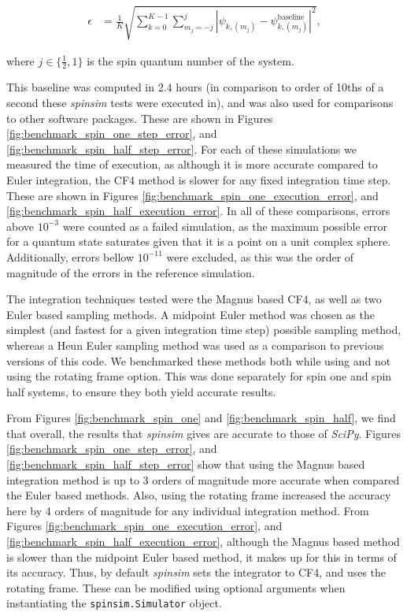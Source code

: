 \documentclass{jors}
\begin{document}
		\begin{align}
			\epsilon &= \frac{1}{K}\sqrt{\sum_{k = 0}^{K - 1}\sum_{m_j = -j}^j|\psi_{k, (m_j)} - \psi_{k, (m_j)}^{\textrm{baseline}}|^2},\label{eq:error}
		\end{align}

		where \(j \in \{\frac12, 1\}\) is the spin quantum number of the system.

		This baseline was computed in 2.4 hours (in comparison to order of 10ths of a second these \emph{spinsim} tests were executed in), and was also used for comparisons to other software packages.
		These are shown in Figures \ref{fig:benchmark_spin_one_step_error}, and \ref{fig:benchmark_spin_half_step_error}.
		For each of these simulations we measured the time of execution, as although it is more accurate compared to Euler integration, the CF4 method is slower for any fixed integration time step.
		These are shown in Figures \ref{fig:benchmark_spin_one_execution_error}, and \ref{fig:benchmark_spin_half_execution_error}.
		In all of these comparisons, errors above \(10^{-3}\) were counted as a failed simulation, as the maximum possible error for a quantum state saturates given that it is a point on a unit complex sphere.
		Additionally, errors bellow \(10^{-11}\) were excluded, as this was the order of magnitude of the errors in the reference simulation.

		The integration techniques tested were the Magnus based CF4, as well as two Euler based sampling methods.
		A midpoint Euler method was chosen as the simplest (and fastest for a given integration time step)  possible sampling method, whereas a Heun Euler sampling method was used as a comparison to previous versions of this code.
		We benchmarked these methods both while using and not using the rotating frame option.
		This was done separately for spin one and spin half systems, to ensure they both yield accurate results.

		From Figures \ref{fig:benchmark_spin_one} and \ref{fig:benchmark_spin_half}, we find that overall, the results that \emph{spinsim} gives are accurate to those of \emph{SciPy}.
		Figures \ref{fig:benchmark_spin_one_step_error}, and \ref{fig:benchmark_spin_half_step_error} show that using the Magnus based integration method is up to 3 orders of magnitude more accurate when compared the Euler based methods.
		Also, using the rotating frame increased the accuracy here by 4 orders of magnitude for any individual integration method.
		From Figures \ref{fig:benchmark_spin_one_execution_error}, and \ref{fig:benchmark_spin_half_execution_error}, although the Magnus based method is slower than the midpoint Euler based method, it makes up for this in terms of its accuracy.
		Thus, by default \emph{spinsim} sets the integrator to CF4, and uses the rotating frame.
		These can be modified using optional arguments when instantiating the \texttt{spinsim.Simulator} object.
\end{document}
